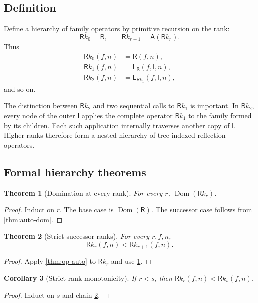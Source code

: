 \documentclass[11pt,oneside]{article}
\newtheorem{theorem}{Theorem}[section]
\newtheorem{corollary}[theorem]{Corollary}
\theoremstyle{definition}
\newcommand{\Index}{\mathsf I}
\newcommand{\Reflect}{\mathsf R}
\newcommand{\Lift}{\mathsf L}
\newcommand{\Auto}{\mathsf A}
\newcommand{\Ram}{\mathsf Rk}
\begin{document}
\subsection{Definition}

Define a hierarchy of family operators by primitive recursion on the rank:
\begin{equation}\label{eq:ramified}
 \Ram_0=\Reflect,
 \qquad
 \Ram_{r+1}=\Auto(\Ram_r).
\end{equation}
Thus
\begin{align*}
 \Ram_0(f,n)&=\Reflect(f,n),\\
 \Ram_1(f,n)&=\Lift_{\Reflect}(f,\Index,n),\\
 \Ram_2(f,n)&=\Lift_{\Ram_1}(f,\Index,n),
\end{align*}
and so on.

The distinction between $\Ram_2$ and two sequential calls to $\Ram_1$ is
important.  In $\Ram_2$, every node of the outer $\Index$ applies the complete
operator $\Ram_1$ to the family formed by its children.  Each such application
internally traverses another copy of $\Index$.  Higher ranks therefore form a
nested hierarchy of tree-indexed reflection operators.

\subsection{Formal hierarchy theorems}

\begin{theorem}[Domination at every rank]\label{thm:rank-dom}
For every $r$, $\operatorname{Dom}(\Ram_r)$.
\end{theorem}
\begin{proof}
Induct on $r$.  The base case is $\operatorname{Dom}(\Reflect)$.  The successor
case follows from \cref{thm:auto-dom}.
\end{proof}

\begin{theorem}[Strict successor ranks]\label{thm:rank-step}
For every $r,f,n$,
\[
 \Ram_r(f,n)<\Ram_{r+1}(f,n).
\]
\end{theorem}
\begin{proof}
Apply \cref{thm:op-auto} to $\Ram_r$ and use
\cref{thm:rank-dom}.
\end{proof}

\begin{corollary}[Strict rank monotonicity]\label{cor:rank-mono}
If $r<s$, then $\Ram_r(f,n)<\Ram_s(f,n)$.
\end{corollary}
\begin{proof}
Induct on $s$ and chain \cref{thm:rank-step}.
\end{proof}
\end{document}
